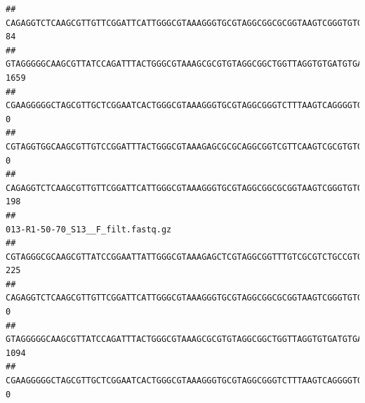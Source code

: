 \documentclass[]{article}
\begin{document}
\begin{verbatim}
## CAGAGGTCTCAAGCGTTGTTCGGATTCATTGGGCGTAAAGGGTGCGTAGGCGGCGCGGTAAGTCGGGTGTGAAATCTCGGAGCTTAACTCCGAAACTGCATTCGATACTGCCGTGCTTGAGGACTGGAGAGGAGACTGGAATTTACGGTGTAGCGGTGAAATGCGTAGATATCGTAAGGAAGACCAGTGGCGAAGGCGGGTCTCTGGACAGTTCCTGACGCTGAGGCACGAAGGCCAGGGGAGCAAACG                                84
## GTAGGGGGCAAGCGTTATCCAGATTTACTGGGCGTAAAGCGCGTGTAGGCGGCTGGTTAGGTGTGATGTGAAATCTTCCGGCTCAACCGGAAAACTGCATTGCAAACCGGCCTGGCTAGAGTGCAGGAGAGGGAAGCGGAATTCCAGGTGTAGCGGTGAAATGCGTAGATATCTGGAGGAACACCAGTGGCGAAGGCGGCTTCCTGGCCTGCAACTGACGCTGAGACGCGAAAGCGTGGGGAGCGAAC                               1659
## CGAAGGGGGCTAGCGTTGCTCGGAATCACTGGGCGTAAAGGGTGCGTAGGCGGGTCTTTAAGTCAGGGGTGAAATCCTGGAGCTCAACTCCAGAACTGCCTTTGATACTGAAGATCTTGAGTTCGGGAGAGGTGAGTGGAACTGCGAGTGTAGAGGTGAAATTCGTAGATATTCGCAAGAACACCAGTGGCGAAGGCGGCTCACTGGCCCGATACTGACGCTGAGGCACGAAAGCGTGGGGAGCAAACA                                 0
## CGTAGGTGGCAAGCGTTGTCCGGATTTACTGGGCGTAAAGAGCGCGCAGGCGGTCGTTCAAGTCGCGTGTGAAAGCCCCCGGCTCAACTGGGGAGGGTCACGCGATACTGATCGACTCGAAGGCAGGAGAGGGTAGTGGAATTCCCGGTGTAGTGGTGAAATGCGTAGATATCGGGAGGAACACCAGTGGCGAAGGCGACTACCTGGCCTGTTCTTGACGCTGAGGCGCGAAAGCTAGGGGAGCAAACG                                 0
## CAGAGGTCTCAAGCGTTGTTCGGATTCATTGGGCGTAAAGGGTGCGTAGGCGGCGCGGTAAGTCGGGTGTGAAATCTCGGGGCTTAACTCCGAAACTGCATTCGATACTGCCGTGCTTGAGGACTGGAGAGGAGACTGGAATTTACGGTGTAGCGGTGAAATGCGTAGATATCGTAAGGAAGACCAGTGGCGAAGGCGGGTCTCTGGACAGTTCCTGACGCTGAGGCACGAAGGCCAGGGGAGCAAACG                               198
##                                                                                                                                                                                                                                                           013-R1-50-70_S13__F_filt.fastq.gz
## CGTAGGGCGCAAGCGTTATCCGGAATTATTGGGCGTAAAGAGCTCGTAGGCGGTTTGTCGCGTCTGCCGTGAAAGTCCGGGGCTCAACTCCGGATCTGCGGTGGGTACGGGCAGACTAGAGTGATGTAGGGGAGACTGGAATTCCTGGTGTAGCGGTGAAATGCGCAGATATCAGGAGGAACACCGATGGCGAAGGCAGGTCTCTGGGCATTAACTGACGCTGAGGAGCGAAAGCATGGGGAGCGAACA                               225
## CAGAGGTCTCAAGCGTTGTTCGGATTCATTGGGCGTAAAGGGTGCGTAGGCGGCGCGGTAAGTCGGGTGTGAAATCTCGGAGCTTAACTCCGAAACTGCATTCGATACTGCCGTGCTTGAGGACTGGAGAGGAGACTGGAATTTACGGTGTAGCGGTGAAATGCGTAGATATCGTAAGGAAGACCAGTGGCGAAGGCGGGTCTCTGGACAGTTCCTGACGCTGAGGCACGAAGGCCAGGGGAGCAAACG                                 0
## GTAGGGGGCAAGCGTTATCCAGATTTACTGGGCGTAAAGCGCGTGTAGGCGGCTGGTTAGGTGTGATGTGAAATCTTCCGGCTCAACCGGAAAACTGCATTGCAAACCGGCCTGGCTAGAGTGCAGGAGAGGGAAGCGGAATTCCAGGTGTAGCGGTGAAATGCGTAGATATCTGGAGGAACACCAGTGGCGAAGGCGGCTTCCTGGCCTGCAACTGACGCTGAGACGCGAAAGCGTGGGGAGCGAAC                               1094
## CGAAGGGGGCTAGCGTTGCTCGGAATCACTGGGCGTAAAGGGTGCGTAGGCGGGTCTTTAAGTCAGGGGTGAAATCCTGGAGCTCAACTCCAGAACTGCCTTTGATACTGAAGATCTTGAGTTCGGGAGAGGTGAGTGGAACTGCGAGTGTAGAGGTGAAATTCGTAGATATTCGCAAGAACACCAGTGGCGAAGGCGGCTCACTGGCCCGATACTGACGCTGAGGCACGAAAGCGTGGGGAGCAAACA                                 0

\end{verbatim}
\end{document}
